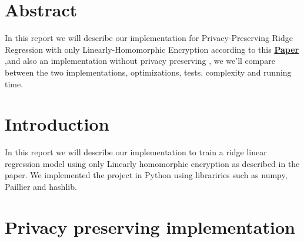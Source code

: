 \documentclass[12pt]{article}
\begin{document}


\section*{Abstract}
In this report we will describe our implementation for Privacy-Preserving Ridge Regression with only Linearly-Homomorphic Encryption according to this \href{https://eprint.iacr.org/2017/979.pdf}{\textbf{Paper}} ,and also an implementation without privacy preserving , we we'll compare between the two implementations, optimizations, tests, complexity and running time.

\section{Introduction}
In this report we will describe our implementation to  train a ridge linear regression model using only Linearly homomorphic encryption as described in the paper.
We implemented the project in Python using librariries such as numpy, Paillier and hashlib.
\section{Privacy preserving implementation}
\end{document}
